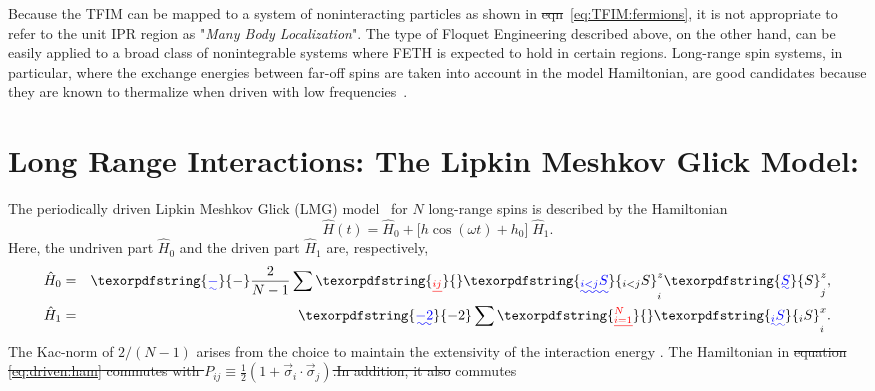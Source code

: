 \documentclass[%
reprint,
superscriptaddress,
amsmath,amssymb,
aps,
prb,
showkeys,
]{revtex4-2}
\providecommand{\DIFaddtex}[1]{{\protect\color{blue}\uwave{#1}}} %
\providecommand{\DIFdeltex}[1]{{\protect\color{red}\sout{#1}}}                      %
\providecommand{\DIFaddbegin}{} %
\providecommand{\DIFaddend}{} %
\providecommand{\DIFdelbegin}{} %
\providecommand{\DIFdelend}{} %
\providecommand{\DIFadd}[1]{\texorpdfstring{\DIFaddtex{#1}}{#1}} %
\providecommand{\DIFdel}[1]{\texorpdfstring{\DIFdeltex{#1}}{}} %
\newcommand{\DIFscaledelfig}{0.5}
\newlength{\DIFdelgraphicswidth} %
\newlength{\DIFdelgraphicsheight} %
\newcommand{\DIFaddincludegraphics}[2][]{{\color{blue}\fbox{\DIFOincludegraphics[#1]{#2}}}} %
\newcommand{\DIFdelincludegraphics}[2][]{%
\sbox{\DIFdelgraphicsbox}{\DIFOincludegraphics[#1]{#2}}%
\settoboxwidth{\DIFdelgraphicswidth}{\DIFdelgraphicsbox} %
\settoboxtotalheight{\DIFdelgraphicsheight}{\DIFdelgraphicsbox} %
\scalebox{\DIFscaledelfig}{%
\parbox[b]{\DIFdelgraphicswidth}{\usebox{\DIFdelgraphicsbox}\\[-\baselineskip] \rule{\DIFdelgraphicswidth}{0em}}\llap{\resizebox{\DIFdelgraphicswidth}{\DIFdelgraphicsheight}{%
\setlength{\unitlength}{\DIFdelgraphicswidth}%
\begin{picture}(1,1)%
\thicklines\linethickness{2pt} %
{\color[rgb]{1,0,0}\put(0,0){\framebox(1,1){}}}%
{\color[rgb]{1,0,0}\put(0,0){\line( 1,1){1}}}%
{\color[rgb]{1,0,0}\put(0,1){\line(1,-1){1}}}%
\end{picture}%
}\hspace*{3pt}}} %
} %
\DeclareRobustCommand{\DIFaddbegin}{\DIFOaddbegin \let\includegraphics\DIFaddincludegraphics} %
\DeclareRobustCommand{\DIFaddend}{\DIFOaddend \let\includegraphics\DIFOincludegraphics} %
\DeclareRobustCommand{\DIFdelbegin}{\DIFOdelbegin \let\includegraphics\DIFdelincludegraphics} %
\DeclareRobustCommand{\DIFdelend}{\DIFOaddend \let\includegraphics\DIFOincludegraphics} %
\begin{document}
{Because the TFIM can be mapped to a system of noninteracting particles as shown in \DIFdelbegin \DIFdel{eqn}\DIFdelend \DIFaddbegin \DIFadd{eq.}\DIFaddend }~\ref{eq:TFIM:fermions}, it is not appropriate to refer to the unit IPR region as "\emph{Many Body Localization}". The type of Floquet Engineering described above, on the other hand, can be easily applied to a broad class of nonintegrable systems where FETH is expected to hold in certain regions. Long-range spin systems, in particular, where the exchange energies between far-off spins are taken into account in the model Hamiltonian, are good candidates because they are known to thermalize when driven with low frequencies~\cite{russomanno_thermalization_2015}.
\section{\label{sec:level3}Long Range Interactions: The Lipkin Meshkov Glick Model: }	
The periodically driven {Lipkin Meshkov Glick (LMG)} model~\cite{lmg1965_1,defenu2018} for $N$ long-range spins is described by the Hamiltonian
\begin{equation}
	\hat{H}(t) = \hat{H}_0 + \big[h \cos{(\omega t)} + h_0\big]\; \hat{H}_1.
	\label{eq:driven:ham}
\end{equation}
Here, the undriven part $\hat{H}_0$ and the driven part $\hat{H}_1$ are, respectively, 
	\begin{eqnarray}
		\hat{H}_0 &=& \DIFaddbegin \DIFadd{-}\DIFaddend \frac{2}{N-1} \sum\DIFdelbegin \DIFdel{_{ij}}%
\DIFdelend \DIFaddbegin \DIFadd{_{i<j}S}\DIFaddend ^z_i \DIFdelbegin %
\DIFdelend \DIFaddbegin \DIFadd{S}\DIFaddend ^z_j,\nonumber \\
		\hat{H}_1 &=& \DIFaddbegin \DIFadd{-2 }\DIFaddend \sum\DIFdelbegin \DIFdel{^N_{i=1}}%
\DIFdelend \DIFaddbegin \DIFadd{_i S}\DIFaddend ^x_i.
		\DIFaddbegin \label{eq:h0h1}
	\DIFaddend \end{eqnarray}
	\DIFdelbegin %
\DIFdelend The Kac-norm of $2/(N-1)$ arises from the choice to maintain the extensivity of the interaction energy\DIFdelbegin %
\DIFdelend . The Hamiltonian in \DIFdelbegin \DIFdel{equation \ref{eq:driven:ham} commutes with $P_{ij} \equiv \displaystyle\frac{1}{2}\left(1+ \vec{\sigma}_i\cdot\vec{\sigma}_j\right)$.In addition, it also }\DIFdelend \DIFaddbegin \DIFadd{eq.~\ref{eq:driven:ham} }\DIFaddend commutes
\end{document}
